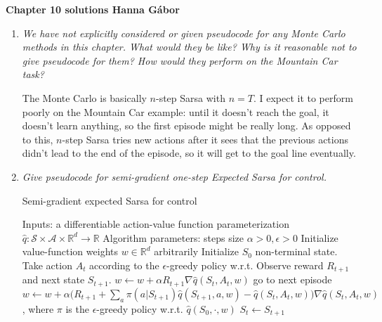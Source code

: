 \documentclass[12pt,a4paper]{article}
\begin{document}
\textbf{Chapter 10 solutions  \hfill Hanna Gábor}

\begin{enumerate}
  \item \textit{We have not explicitly considered or given pseudocode for any Monte Carlo
  methods in this chapter. What would they be like? Why is it reasonable not to give
  pseudocode for them? How would they perform on the Mountain Car task?}

  The Monte Carlo is basically $n$-step Sarsa with $n = T$. I expect it to perform
  poorly on the Mountain Car example: until it doesn't reach the goal, it doesn't
  learn anything, so the first episode might be really long.
  As opposed to this, $n$-step Sarsa tries new actions after it sees
  that the previous actions didn't lead to the end of the episode, so it will
  get to the goal line eventually.

  \item \textit{Give pseudocode for semi-gradient one-step Expected Sarsa for control.}

  \begin{algorithm}
    \caption{Semi-gradient expected Sarsa for control}
    \begin{algorithmic}
      \STATE Inputs: a differentiable action-value function parameterization
      $\hat{q}: \mathcal{S} \times \mathcal{A} \times \mathbb{R}^d \rightarrow \mathbb{R}$
      \STATE Algorithm parameters: steps size $\alpha > 0, \epsilon > 0$
      \STATE Initialize value-function weights $w \in \mathbb{R}^d$ arbitrarily
        \STATE Initialize $S_0$ non-terminal state.
          \STATE Take action $A_t$ according to the $\epsilon$-greedy policy w.r.t.
          \STATE Observe reward $R_{t + 1}$ and next state $S_{t + 1}$.
            \STATE $w \leftarrow w + \alpha R_{t + 1} \nabla\hat{q}(S_t, A_t, w)$
            \STATE go to next episode
          \ELSE
            \STATE $w \leftarrow w + \alpha\Big(R_{t + 1} + \sum\limits_a\pi(a|S_{t + 1})
            \hat{q}(S_{t + 1}, a, w) - \hat{q}(S_t, A_t, w)\Big)
            \nabla\hat{q}(S_t, A_t, w)$, where $\pi$ is the $\epsilon$-greedy policy w.r.t.
            $\hat{q}(S_0, \cdot, w)$
            \STATE $S_t \leftarrow S_{t + 1}$
          \ENDIF
        \ENDFOR
      \ENDFOR
    \end{algorithmic}
  \end{algorithm}
\end{enumerate}
\end{document}
